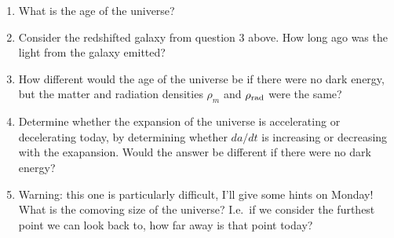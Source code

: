 \documentclass[aps,prd,superscriptaddress,groupedaddress,nofootinbib,nobibnotes]{revtex4}
\begin{document}
\begin{enumerate}[resume]
\item What is the age of the universe?
\item Consider the redshifted galaxy from question 3 above.  How long ago was the
  light from the galaxy emitted?
\item How different would the age of the universe be if there were no dark energy, but
   the matter and radiation densities $\rho_m$ and $\rho_{\rm rad}$ were the same?
\item Determine whether the expansion of the universe is accelerating or decelerating today,
  by determining whether $da/dt$ is increasing or decreasing with the exapansion.  Would
  the answer be different if there were no dark energy?
\item Warning: this one is particularly difficult, I'll give some hints on Monday!
  What is the comoving size of the universe?  I.e.~if we consider the furthest point we
  can look back to, how far away is that point today?
\end{enumerate}


%

% 
% 

\end{document}
